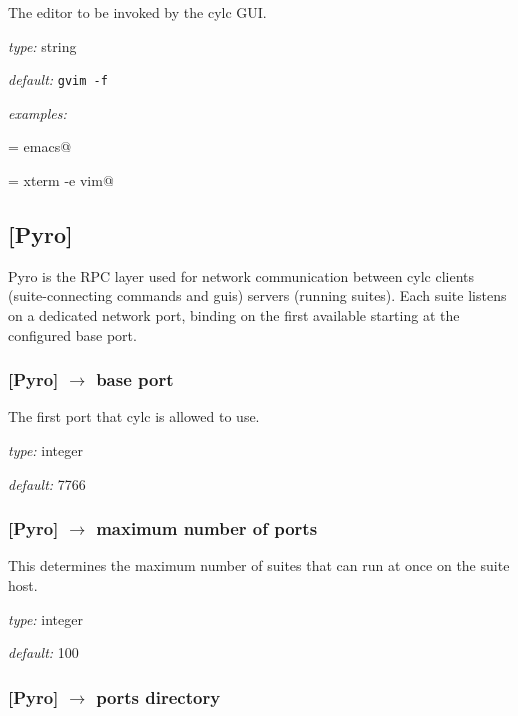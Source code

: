 The editor to be invoked by the cylc GUI.

\begin{myitemize}
\item {\em type:} string
\item {\em default:} \lstinline=gvim -f=
\item {\em examples:}
    \begin{myitemize}
            \item \lstinline@gui = emacs@
            \item \lstinline@gui = xterm -e vim@
    \end{myitemize}
\end{myitemize}


\subsection{[Pyro]}

Pyro is the RPC layer used for network communication between cylc
clients (suite-connecting commands and guis) servers (running suites).
Each suite listens on a dedicated network port, binding on the first
available starting at the configured base port.

\subsubsection[base port]{[Pyro] $\rightarrow$ base port }

The first port that cylc is allowed to use.

\begin{myitemize}
\item {\em type:} integer
\item {\em default:} 7766
\end{myitemize}

\subsubsection[maximum number of ports]{[Pyro] $\rightarrow$ maximum number of ports}

This determines the maximum number of suites that can run at once on the
suite host.

\begin{myitemize}
\item {\em type:} integer
\item {\em default:} 100
\end{myitemize}

\subsubsection[ports directory]{[Pyro] $\rightarrow$ ports directory}

